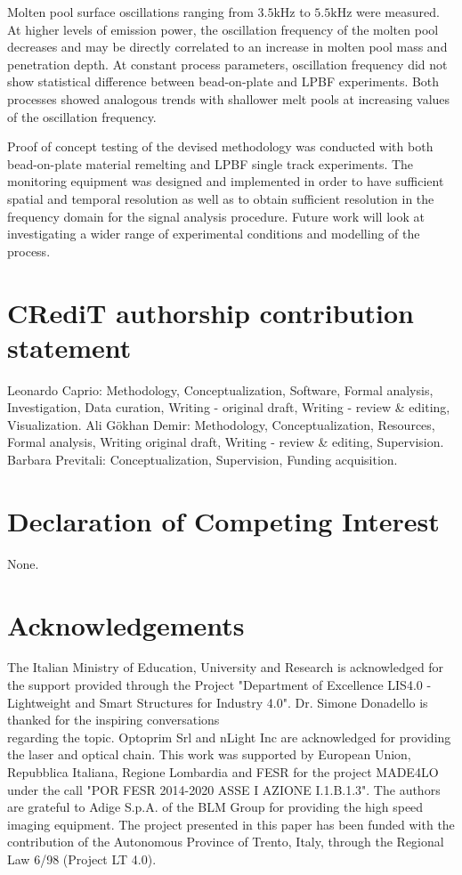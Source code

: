\documentclass[10pt]{article}
\begin{document}
Molten pool surface oscillations ranging from $3.5 \mathrm{kHz}$ to $5.5 \mathrm{kHz}$ were measured. At higher levels of emission power, the oscillation frequency of the molten pool decreases and may be directly correlated to an increase in molten pool mass and penetration depth. At constant process parameters, oscillation frequency did not show statistical difference between bead-on-plate and LPBF experiments. Both processes showed analogous trends with shallower melt pools at increasing values of the oscillation frequency.

Proof of concept testing of the devised methodology was conducted with both bead-on-plate material remelting and LPBF single track experiments. The monitoring equipment was designed and implemented in order to have sufficient spatial and temporal resolution as well as to obtain sufficient resolution in the frequency domain for the signal analysis procedure. Future work will look at investigating a wider range of experimental conditions and modelling of the process.

\section*{CRediT authorship contribution statement}
Leonardo Caprio: Methodology, Conceptualization, Software, Formal analysis, Investigation, Data curation, Writing - original draft, Writing - review \& editing, Visualization. Ali Gökhan Demir: Methodology, Conceptualization, Resources, Formal analysis, Writing original draft, Writing - review \& editing, Supervision. Barbara Previtali: Conceptualization, Supervision, Funding acquisition.

\section*{Declaration of Competing Interest}
None.

\section*{Acknowledgements}
The Italian Ministry of Education, University and Research is acknowledged for the support provided through the Project "Department of Excellence LIS4.0 - Lightweight and Smart Structures for Industry 4.0". Dr. Simone Donadello is thanked for the inspiring conversations\\
regarding the topic. Optoprim Srl and nLight Inc are acknowledged for providing the laser and optical chain. This work was supported by European Union, Repubblica Italiana, Regione Lombardia and FESR for the project MADE4LO under the call "POR FESR 2014-2020 ASSE I AZIONE I.1.B.1.3". The authors are grateful to Adige S.p.A. of the BLM Group for providing the high speed imaging equipment. The project presented in this paper has been funded with the contribution of the Autonomous Province of Trento, Italy, through the Regional Law 6/98 (Project LT 4.0).
\end{document}
